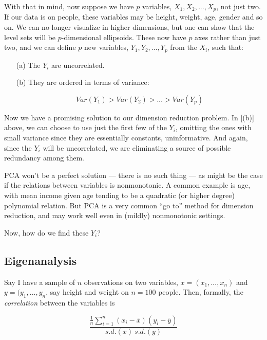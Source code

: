 With that in mind, now suppose we have $p$ variables, $X_1,
X_2,...,X_p$, not just two.  If our data is on people, these variables
may be height, weight, age, gender and so on.  We can no longer
visualize in higher dimensions, but one can show that the level sets
will be $p$-dimensional ellipsoids.  These now have $p$ axes rather than
just two, and we can define $p$ new variables, $Y_1,Y_2,...,Y_p$ from
the $X_i$, such that:

\begin{itemize}

\item [(a)] The $Y_i$ are uncorrelated.

\item [(b)] They are ordered in terms of variance:

\begin{equation}
Var(Y_1) > Var(Y_2) > ... > Var(Y_p)
\end{equation}

\end{itemize} 

Now we have a promising solution to our dimension reduction problem.  In
[(b)] above, we can choose to use just the first few of the $Y_i$,
omitting the ones with small variance since they are essentially
constants, uninformative.  And again, since the $Y_i$ will be
uncorrelated, we are eliminating a source of possible redundancy among
them.

PCA won't be a perfect solution --- there is no such thing --- as might
be the case if the relations between variables is nonmonotonic.  A
common example is age, with mean income given age tending to be a
quadratic (or higher degree) polynomial relation.  But PCA is a very
common ``go to'' method for dimension reduction, and may work well even
in (mildly) nonmonotonic settings.

Now, how do we find these $Y_i$?

\subsection{Eigenanalysis}

Say I have a sample of $n$ observations on two variables, $x =
(x_1,...,x_n)$ and $y=(y_1,...,y_n$, say height and weight on $n = 100$
people.  Then, formally, the \textit{correlation} between the variables
is

\begin{equation}
\label{corrdef}
\frac
{\frac{1}{n} \sum_{i=1}^n (x_i-\overline{x}) (y_i-\overline{y})}
{s.d.(x) ~ s.d.(y)}
\end{equation}

